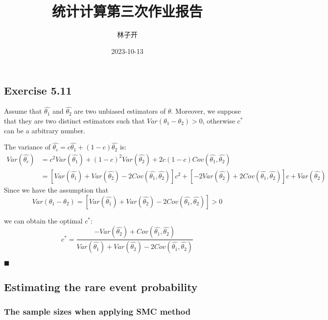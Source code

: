 \documentclass[
]{article}
\title{统计计算第三次作业报告}
\author{林子开}
\date{2023-10-13}
\begin{document}
\maketitle

\hypertarget{exercise-5.11}{%
\subsection{Exercise 5.11}\label{exercise-5.11}}

Assume that \(\hat{\theta_1}\) and \(\hat{\theta_2}\) are two unbiased
estimators of \(\theta\). Moreover, we suppose that they are two
distinct estimators such that \(Var(\theta_1-\theta_2)>0\), otherwise
\(c^*\) can be a arbitrary number.

The variance of \(\hat{\theta_c}=c\hat{\theta_1}+(1-c)\hat{\theta_2}\)
is: \[
\begin{align}
  Var(\hat{\theta_c})&= c^2Var(\hat{\theta_1}) + (1-c)^2Var(\hat{\theta_2})+2c(1-c)Cov(\hat{\theta_1},\hat{\theta_2}) \\
  &= \left[Var(\hat{\theta_1})+Var(\hat{\theta_2})-2Cov(\hat{\theta_1},\hat{\theta_2})\right]c^2
  +\left[-2Var(\hat{\theta_2})+2Cov(\hat{\theta_1},\hat{\theta_2})\right]c
  + Var(\hat{\theta_2})
\end{align}
\] Since we have the assumption that
\[Var(\theta_1-\theta_2) = \left[Var(\hat{\theta_1})+Var(\hat{\theta_2})-2Cov(\hat{\theta_1},\hat{\theta_2})\right]>0\]

we can obtain the optimal \(c^*\): \[ 
c^* = \frac{-Var(\hat{\theta_2})+Cov(\hat{\theta_1},\hat{\theta_2})}{Var(\hat{\theta_1})+Var(\hat{\theta_2})-2Cov(\hat{\theta_1},\hat{\theta_2})}
\]

\(\blacksquare\)

\hypertarget{estimating-the-rare-event-probability}{%
\subsection{Estimating the rare event
probability}\label{estimating-the-rare-event-probability}}

\hypertarget{the-sample-sizes-when-applying-smc-method}{%
\subsubsection{The sample sizes when applying SMC
method}\label{the-sample-sizes-when-applying-smc-method}}
\end{document}
